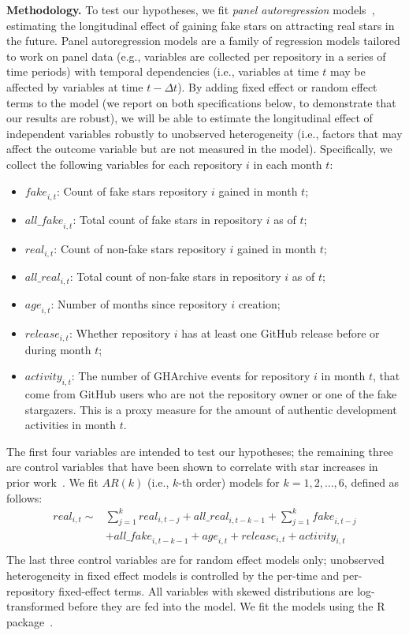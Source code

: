 \textbf{Methodology.}
To test our hypotheses, we fit \emph{panel autoregression} models~\cite{hanck2021introduction}, estimating the longitudinal effect of gaining fake stars on attracting real stars in the future.
Panel autoregression models are a family of regression models tailored to work on panel data (e.g., variables are collected per repository in a series of time periods) with temporal dependencies (i.e., variables at time $t$ may be affected by variables at time $t - \Delta t$).
By adding fixed effect or random effect terms to the model (we report on both specifications below, to demonstrate that our results are robust), we will be able to estimate the longitudinal effect of independent variables robustly to unobserved heterogeneity (i.e., factors that may affect the outcome variable but are not measured in the model).
Specifically, %
we collect the following variables for each repository $i$ in each month $t$: %
\begin{itemize}[leftmargin=10pt]
    \item $\textit{fake}_{i,t}$: Count of fake stars repository $i$ gained in month $t$;
    \item $\textit{all\_fake}_{i,t}$:  Total count of fake stars in repository $i$ as of $t$;
    \item $\textit{real}_{i,t}$: Count of non-fake stars repository $i$ gained in month $t$;
    \item $\textit{all\_real}_{i,t}$: Total count of non-fake stars in repository $i$ as of $t$;
    \item $\textit{age}_{i,t}$: Number of months since repository $i$ creation;
    \item $\textit{release}_{i,t}$: Whether repository $i$ has at least one GitHub release before or during month $t$;
    \item $\textit{activity}_{i,t}$: The number of \textsf{GHArchive} events for repository $i$ in month $t$, that come from GitHub users who are not the repository owner or one of the fake stargazers. This is a proxy measure for the amount of authentic development activities in month $t$. 
\end{itemize}
The first four variables are intended to test our hypotheses; the remaining three are control variables that have been shown to correlate with star increases in prior work~\cite{DBLP:conf/icse/FangLHV22}. 
We fit $AR(k)$ (i.e., $k$-th order) models for $k = 1, 2, ..., 6$, defined as follows:
\begin{align*}
    \textit{real}_{i,t} \sim &\sum_{j=1}^k \textit{real}_{i, t-j} + \textit{all\_real}_{i, t - k - 1} + \sum_{j=1}^k \textit{fake}_{i, t-j} \\& + \textit{all\_fake}_{i, t - k - 1} + \textit{age}_{i,t} + \textit{release}_{i,t} + \textit{activity}_{i,t}\\
\end{align*}
The last three control variables are for random effect models only; unobserved heterogeneity in fixed effect models is controlled by the per-time and per-repository %
fixed-effect terms.
All variables with skewed distributions are log-transformed before they are fed into the model.
We fit the models using the R  package~\cite{r-plm}.

